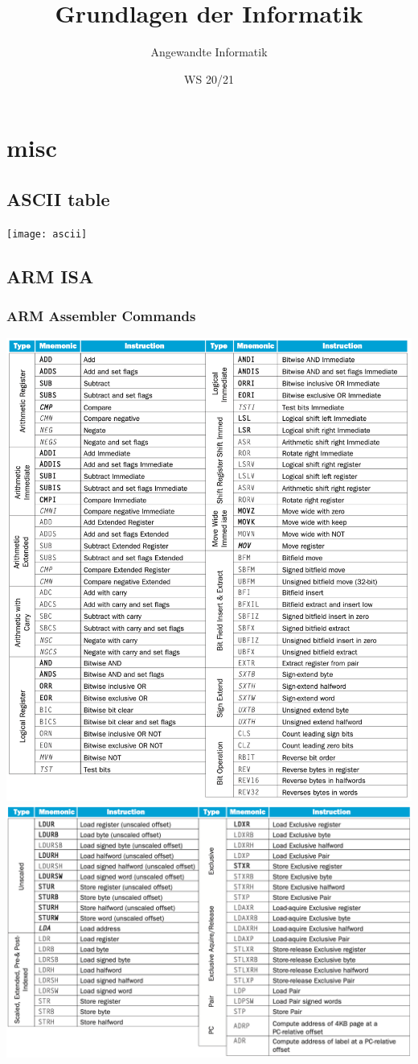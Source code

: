 \documentclass[a4paper]{scrartcl}
\author{Angewandte Informatik}
\title{Grundlagen der Informatik}
\date{WS 20/21}
\begin{document}
    \section{misc}
    \subsection{ASCII table}
        \centering\texttt{[image: ascii]}
    \subsection{ARM ISA}
        \subsubsection{ARM Assembler Commands}
        \centering\includegraphics[scale=0.25]{arm_assembler1}
        \centering\includegraphics[scale=0.25]{arm_assembler2}
\end{document}
